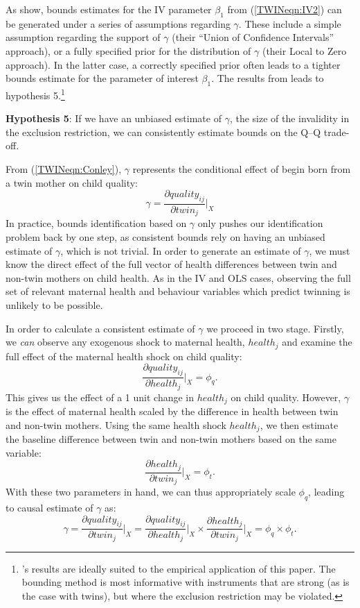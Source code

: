 \documentclass[subeqn]{article}
\begin{document}
\begin{spacing}{1.4}
As \citet{Conleyetal2012} show, bounds estimates for the IV parameter $\beta_1$
from (\ref{TWINeqn:IV2}) can be generated under a series of assumptions regarding
$\gamma$.  These include a simple assumption regarding the support of $\gamma$
(their ``Union of Confidence Intervals'' approach), or a fully specified prior
for the distribution of $\gamma$ (their Local to Zero approach).  In the latter
case, a correctly specified prior often leads to a tighter bounds estimate for
the parameter of interest $\beta_1$.  The results from \citet{Conleyetal2012}
leads to hypothesis 5.\footnote{\citeauthor{Conleyetal2012}'s results are ideally
  suited to the empirical application of this paper.  The bounding method is most
  informative with instruments that are strong (as is the case with twins), but
  where the exclusion restriction may be violated.}

\noindent \textbf{Hypothesis 5}: If we have an unbiased estimate of $\gamma$, the size of the invalidity in the exclusion restriction, we can consistently estimate bounds on the Q--Q trade-off.

From (\ref{TWINeqn:Conley}), $\gamma$ represents the conditional effect of
begin born from a twin mother on child quality:
\[
\gamma=\frac{\partial quality_{ij}}{\partial twin_j}\bigg|_{X}
\]
In practice, bounds identification based on $\gamma$ only pushes our
identification problem back by one step, as consistent bounds rely on having
an unbiased estimate of $\gamma$, which is not trivial.  In order to generate
an estimate of $\gamma$, we must know the direct effect of the full vector of
health differences between twin and non-twin mothers on child health.  As in
the IV and OLS cases, observing the full set of relevant maternal health and
behaviour variables which predict twinning is unlikely to be possible.

In order to calculate a consistent estimate of $\gamma$ we proceed in two
stage.  Firstly, we \emph{can} observe any exogenous shock to maternal health,
$health_j$ and examine the full effect of the maternal health shock on child
quality:
\[
\frac{\partial quality_{ij}}{\partial health_j}\bigg|_{X}=\phi_q.
\]
This gives us the effect of a 1 unit change in $health_j$ on child quality.
However, $\gamma$ is the effect of maternal health scaled by the difference
in health between twin and non-twin mothers.  Using the same health shock
$health_j$, we then estimate the baseline difference between twin and non-twin
mothers based on the same variable:
\[
\frac{\partial health_j}{\partial twin_j}\bigg|_{X}=\phi_t.\]
With these two parameters in hand, we can thus appropriately scale $\phi_q$,
leading to causal estimate of $\gamma$ as:
\begin{equation}
  \gamma=\frac{\partial quality_{ij}}{\partial twin_j}\bigg|_{X} = \frac{\partial quality_{ij}}{\partial health_j}\bigg|_{X} \times \frac{\partial health_j}{\partial twin_j}\bigg|_{X} =\phi_q\times\phi_t.
\end{equation}


\end{spacing}
\end{document}
